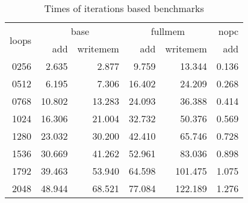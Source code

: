 \begin{table}
    \centering
    \begin{tabular}{r|rr|rr|r}
        \multirow{2}{*}{loops} & \multicolumn{2}{c|}{base} & \multicolumn{2}{c|}{fullmem} & nopc                      \\
                               & add                       & writemem                     & add    & writemem & add   \\ \hline
        0256                   & 2.635                     & 2.877                        & 9.759  & 13.344   & 0.136 \\
        0512                   & 6.195                     & 7.306                        & 16.402 & 24.209   & 0.268 \\
        0768                   & 10.802                    & 13.283                       & 24.093 & 36.388   & 0.414 \\
        1024                   & 16.306                    & 21.004                       & 32.732 & 50.376   & 0.569 \\
        1280                   & 23.032                    & 30.200                       & 42.410 & 65.746   & 0.728 \\
        1536                   & 30.669                    & 41.262                       & 52.961 & 83.036   & 0.898 \\
        1792                   & 39.463                    & 53.940                       & 64.598 & 101.475  & 1.075 \\
        2048                   & 48.944                    & 68.521                       & 77.084 & 122.189  & 1.276 \\
    \end{tabular}
    \caption{Times of iterations based benchmarks}\label{tab:time_iter}
\end{table}


